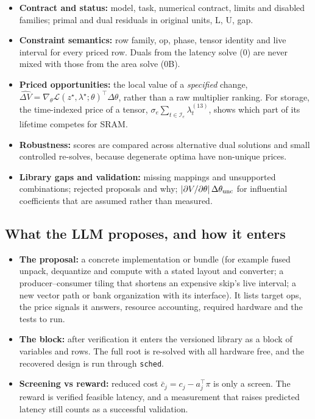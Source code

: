 \documentclass[10pt]{article}
\renewcommand{\_}{\textunderscore\allowbreak}
\begin{document}
\begin{itemize}
 \item \textbf{Contract and status:} model, task, numerical contract, limits and disabled families; primal and dual residuals in original units, L, U, gap.
 \item \textbf{Constraint semantics:} row family, op, phase, tensor identity and live interval for every priced row. Duals from the latency solve (0) are never mixed with those from the area solve (0B).
 \item \textbf{Priced opportunities:} the local value of a \emph{specified} change, $\widehat{\Delta V}=\nabla_\theta\mathcal L(z^\star,\allowbreak{}\lambda^\star;\allowbreak{}\theta)^{\top}\Delta\theta$, rather than a raw multiplier ranking. For storage, the time-indexed price of a tensor, $\sigma_e\sum_{t\in\mathcal I_e}\lambda^{(13)}_t$, shows which part of its lifetime competes for SRAM.
 \item \textbf{Robustness:} scores are compared across alternative dual solutions and small controlled re-solves, because degenerate optima have non-unique prices.
 \item \textbf{Library gaps and validation:} missing mappings and unsupported combinations; rejected proposals and why; $|\partial V/\partial\theta|\,\allowbreak{}\Delta\theta_{\rm unc}$ for influential coefficients that are assumed rather than measured.
 
\end{itemize}
 
\subsection*{What the LLM proposes, and how it enters}
 
\begin{itemize}
 \item \textbf{The proposal:} a concrete implementation or bundle (for example fused unpack, dequantize and compute with a stated layout and converter; a producer--consumer tiling that shortens an expensive skip's live interval; a new vector path or bank organization with its interface). It lists target ops, the price signals it answers, resource accounting, required hardware and the tests to run.
 \item \textbf{The block:} after verification it enters the versioned library as a block of variables and rows. The full root is re-solved with all hardware free, and the recovered design is run through \texttt{sched}.
 \item \textbf{Screening vs reward:} reduced cost $\bar c_j=c_j-a_j^{\top}\pi$ is only a screen. The reward is verified feasible latency, and a measurement that raises predicted latency still counts as a successful validation.
 
\end{itemize}
 
\end{document}
